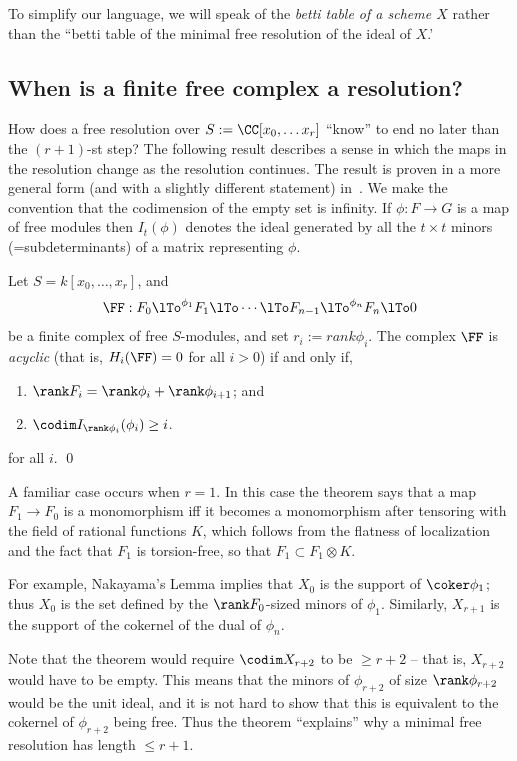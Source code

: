 To simplify our language, we will speak of the \emph{betti table of a scheme $X$} rather than the ``betti table of the minimal free resolution of the ideal of $X$.'

\subsection{When is a finite free complex a resolution?}
How does a free resolution over $S := \CC[x_0, \dots x_r]$ ``know'' to end no later than the $(r+1)$-st step? 
The following result describes a sense in which the maps in the resolution change as the resolution continues.
The result is proven in a more general form (and with a slightly different statement) 
in~\cite[Theorem 20.9]{Eisenbud1995}. We make the convention
that the codimension of the empty set is infinity. If $\phi: F\to G$ is a map of free modules then
$I_t(\phi)$ denotes the ideal generated by all the $t\times t$ minors (=subdeterminants) of a matrix representing $\phi$.


\begin{theorem}\label{WMACE}
 Let $S = k[x_0,\dots, x_r]$, and
 $$ 
\FF:  F_0\lTo^{\phi_1}F_1 \lTo \cdots \lTo F_{n-1}\lTo^{\phi_n} F_n\lTo 0
 $$
be a finite complex of free $S$-modules, and set $r_i := rank \phi_i$. 
The complex $\FF$ is \emph{acyclic} (that is, $H_i(\FF) = 0$ for all $i>0$) if and only if,
\begin{enumerate}
 \item $\rank F_i = \rank \phi_i+\rank \phi_{i+1}$; and
 \item $\codim I_{\rank \phi_i}(\phi_i) \geq i$.
\end{enumerate}
for all $i$.
\qed
\end{theorem}

A familiar case occurs when  $r=1$. In this case the theorem says that a map $F_1\to F_0$ is a monomorphism iff it becomes a monomorphism after tensoring with the field of rational functions $K$, which follows from the flatness of
localization and the fact that $F_1$ is torsion-free, so that
$F_1 \subset F_1 \otimes K$. 

For example, Nakayama's Lemma implies that $X_{0}$ is the support of $\coker \phi_{1}$; thus $X_{0}$ is the set defined by the $\rank F_{0}$-sized minors of $\phi_{1}$. Similarly, 
$X_{r+1}$ is the support of the cokernel of the dual of $\phi_{n}$. 

Note that the theorem would require $\codim X_{r+2}$ to be $\geq r+2$ -- that is, $X_{r+2}$ would have to be empty. 
This means that the minors of $\phi_{r+2}$ of size $\rank \phi_{r+2}$ would be the unit ideal, and it is not hard to show
that this is equivalent to the cokernel of $\phi_{r+2}$ being free. Thus the theorem ``explains'' why a minimal free resolution
has length $\leq r+1$.

